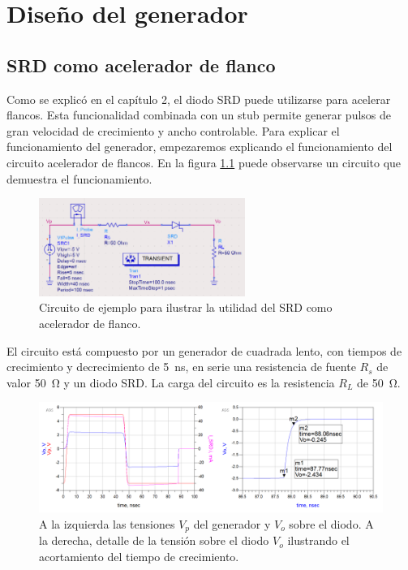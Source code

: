 \chapter{Diseño del generador}

\section{SRD como acelerador de flanco}
\label{sec:srd_sharpener}

Como se explicó en el capítulo 2, el diodo SRD puede utilizarse para
acelerar flancos. Esta funcionalidad combinada con un stub permite generar
pulsos de gran velocidad de crecimiento y ancho controlable. Para explicar el
funcionamiento del generador, empezaremos explicando el funcionamiento del
circuito acelerador de flancos. En la figura \ref{fig:srd_sharpener} puede
observarse un circuito que demuestra el funcionamiento.

\begin{figure}
  \centering
    \includegraphics[width=0.6\textwidth]{images/srd_sharpener_circuit.png}
    \caption{Circuito de ejemplo para ilustrar la utilidad del SRD como
    acelerador de flanco.}
    \label{fig:srd_sharpener}
\end{figure}

El circuito está compuesto por un generador de cuadrada lento, con tiempos de
crecimiento y decrecimiento de \qty{5}{\nano\second}, en serie una resistencia
de fuente $R_s$ de valor \qty{50}{\ohm} y un diodo SRD. La carga del circuito es
la resistencia $R_L$ de \qty{50}{\ohm}.

\begin{figure}[tbp]
    \centering
    \includegraphics[width=\textwidth]{images/srd_sharpener_result.png}
    \caption{A la izquierda las tensiones $V_p$ del generador y $V_o$ sobre el
    diodo. A la derecha, detalle de la tensión sobre el diodo $V_o$ ilustrando el
    acortamiento del tiempo de crecimiento.}
    \label{fig:srd_sharpener_result}
\end{figure}

